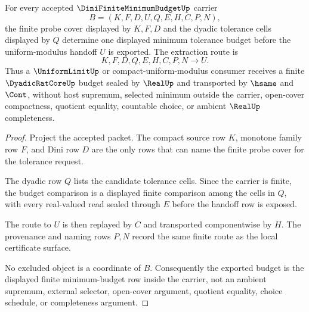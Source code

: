 \begin{theorem}
\label{thm:dini-theorem-compact-finite-minimum-budget}
For every accepted $\DiniFiniteMinimumBudgetUp$ carrier
$$
B=(K,F,D,U,Q,E,H,C,P,N),
$$
the finite probe cover displayed by $K,F,D$ and the dyadic tolerance cells displayed by $Q$ determine one displayed minimum tolerance budget before the uniform-modulus handoff $U$ is exported. The extraction route is
$$
K,F,D,Q,E,H,C,P,N \longrightarrow U .
$$
Thus a $\UniformLimitUp$ or compact-uniform-modulus consumer receives a finite $\DyadicRatCoreUp$ budget sealed by $\RealUp$ and transported by $\hsame$ and $\Cont$, without host supremum, selected minimum outside the carrier, open-cover compactness, quotient equality, countable choice, or ambient $\RealUp$ completeness.
\end{theorem}
\begin{proof}
Project the accepted packet. The compact source row $K$, monotone family row $F$, and Dini row $D$ are the only rows that can name the finite probe cover for the tolerance request.

The dyadic row $Q$ lists the candidate tolerance cells. Since the carrier is finite, the budget comparison is a displayed finite comparison among the cells in $Q$, with every real-valued read sealed through $E$ before the handoff row is exposed.

The route to $U$ is then replayed by $C$ and transported componentwise by $H$. The provenance and naming rows $P,N$ record the same finite route as the local certificate surface.

No excluded object is a coordinate of $B$. Consequently the exported budget is the displayed finite minimum-budget row inside the carrier, not an ambient supremum, external selector, open-cover argument, quotient equality, choice schedule, or completeness argument.
\end{proof}



